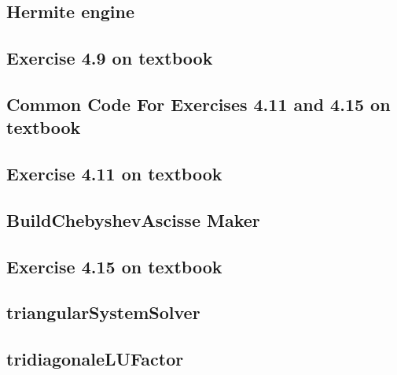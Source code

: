 \subsection{Hermite engine}
\label{subsec:hermiteEngineCode}


\subsection{Exercise 4.9 on textbook}
\label{subsec:exercise49}


\subsection{Common Code For Exercises 4.11 and 4.15 on textbook}
\label{subsec:commonFactorForExercises411415}


\subsection{Exercise 4.11 on textbook}
\label{subsec:exercise411}


\subsection{BuildChebyshevAscisse Maker}
\label{subsec:buildChebyshevAscisse}


\subsection{Exercise 4.15 on textbook}
\label{subsec:exercise415}


\subsection{triangularSystemSolver}
\label{subsec:triangularSystemSolver}


\subsection{tridiagonaleLUFactor}
\label{subsec:tridiagonaleLUFactor}



